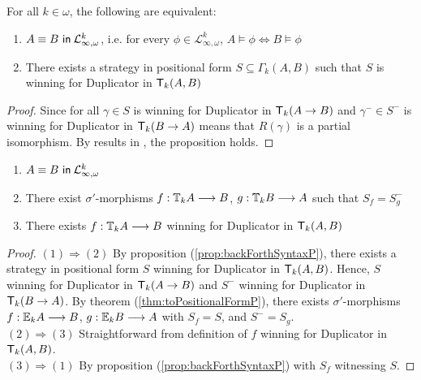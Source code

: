 \begin{prop}
For all $k \in \omega$, the following are equivalent:
\begin{enumerate}[label=(\arabic*)$_{k}$]
\item ${A \equiv B \ \mathsf{in}\: \mathcal{L}^{k}_{\infty,\omega}}$, i.e. for every $\phi \in \mathcal{L}^{k}_{\infty,\omega}$, $A \vDash \phi \Leftrightarrow B \vDash \phi$
\item There exists a strategy in positional form $S \subseteq \Gamma_{k}(A,B)$ such that $S$ is winning for Duplicator in ${\mathsf{T}_{k}(A,B)}$
\end{enumerate}
\begin{proof}
Since for all $\gamma \in S$ is winning for Duplicator in ${\mathsf{T}_{k}(A \rightarrow B)}$ and $\gamma^{-} \in S^{-}$ is winning for Duplicator in ${\mathsf{T}_{k}(B \rightarrow A)}$ means that $R(\gamma)$ is a partial isomorphism. By results in \cite{Immerman1982}, the proposition holds.
\end{proof}
\begin{cor}
\begin{enumerate}[label=(\arabic*)]
\item ${A \equiv B \ \mathsf{in}\: \mathcal{L}^{k}_{\infty,\omega}}$ 
\item There exist $\sigma'$-morphisms $f:{\mathbb{T}_{k}A} \longrightarrow B$, $g:{\mathbb{T}_{k}B} \longrightarrow A$ such that $S_{f} = S_{g}^{-}$ 
\item There exists $f:{\mathbb{T}_{k}A} \longrightarrow B$ winning for Duplicator in ${\mathsf{T}_{k}(A,B)}$ 
\end{enumerate}
\begin{proof}
$(1) \Rightarrow (2)$ By proposition (\ref{prop:backForthSyntaxP}), there exists a strategy in positional form $S$ winning for Duplicator in ${\mathsf{T}_{k}(A,B)}$. Hence, $S$ winning for Duplicator in ${\mathsf{T}_{k}(A \rightarrow B)}$ and $S^{-}$ winning for Duplicator in ${\mathsf{T}_{k}(B \rightarrow A)}$. By theorem (\ref{thm:toPositionalFormP}), there exists $\sigma'$-morphisms $f:{\mathbb{E}_{k}A} \longrightarrow B$, $g:{\mathbb{E}_{k}B} \longrightarrow A$ with $S_{f} = S$, and $S^{-} = S_{g}$. \\ 
$(2) \Rightarrow (3)$ Straightforward from definition of $f$ winning for Duplicator in ${\mathsf{T}_{k}(A,B)}$. \\ 
$(3) \Rightarrow (1)$ By proposition (\ref{prop:backForthSyntaxP}) with $S_{f}$ witnessing $S$.  
\end{proof}
\label{cor:backForthP}
\end{cor}
\label{prop:backForthSyntaxP}
\end{prop}
